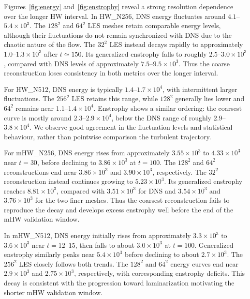 \documentclass[authoryear,preprint,review,12pt]{elsarticle}
\begin{document}
Figures~\ref{fig:energy} and~\ref{fig:enstrophy} reveal a strong resolution dependence over the longer HW interval. In HW\_N256, DNS energy fluctuates around $4.1$--$5.4\times10^3$. The $128^2$ and $64^2$ LES meshes retain comparable energy levels, although their fluctuations do not remain synchronized with DNS due to the chaotic nature of the flow. The $32^2$ LES instead decays rapidly to approximately $1.0$--$1.3\times10^3$ after $t\simeq150$. Its generalized enstrophy falls to roughly $2.5$--$3.0\times10^3$, compared with DNS levels of approximately $7.5$--$9.5\times10^3$. Thus the coarse reconstruction loses consistency in both metrics over the longer interval.

For HW\_N512, DNS energy is typically $1.4$--$1.7\times10^4$, with intermittent larger fluctuations. The $256^2$ LES retains this range, while $128^2$ generally lies lower and $64^2$ remains near $1.1$--$1.4\times10^4$. Enstrophy shows a similar ordering: the coarsest curve is mostly around $2.3$--$2.9\times10^4$, below the DNS range of roughly $2.9$--$3.8\times10^4$. We observe good agreement in the fluctuation levels and statistical behaviour, rather than pointwise comparison the turbulent trajectory.

For mHW\_N256, DNS energy rises from approximately $3.55\times10^3$ to $4.33\times10^3$ near $t=30$, before declining to $3.86\times10^3$ at $t=100$. The $128^2$ and $64^2$ reconstructions end near $3.86\times10^3$ and $3.90\times10^3$, respectively. The $32^2$ reconstruction instead continues growing to $5.23\times10^3$. Its generalized enstrophy reaches $8.81\times10^3$, compared with $3.51\times10^3$ for DNS and $3.54\times10^3$ and $3.76\times10^3$ for the two finer meshes. Thus the coarsest reconstruction fails to reproduce the decay and develops excess enstrophy well before the end of the mHW validation window.

In mHW\_N512, DNS energy initially rises from approximately $3.3\times10^3$ to $3.6\times10^3$ near $t=12$--$15$, then falls to about $3.0\times10^3$ at $t=100$. Generalized enstrophy similarly peaks near $5.4\times10^3$ before declining to about $2.7\times10^3$. The $256^2$ LES closely follows both trends. The $128^2$ and $64^2$ energy curves end near $2.9\times10^3$ and $2.75\times10^3$, respectively, with corresponding enstrophy deficits. This decay is consistent with the progression toward laminarization motivating the shorter mHW validation window.
\end{document}
